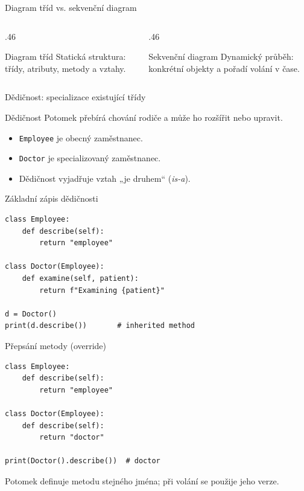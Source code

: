 \documentclass[aspectratio=169]{beamer}
\begin{document}
\begin{frame}{Diagram tříd vs. sekvenční diagram}
  \begin{columns}[T]
    \begin{column}{.46\textwidth}
      \begin{block}{Diagram tříd}
        Statická struktura: třídy, atributy, metody a vztahy.
      \end{block}
    \end{column}
    \begin{column}{.46\textwidth}
      \begin{block}{Sekvenční diagram}
        Dynamický průběh: konkrétní objekty a pořadí volání v čase.
      \end{block}
    \end{column}
  \end{columns}
\end{frame}

\begin{frame}{Dědičnost: specializace existující třídy}
  \begin{block}{Dědičnost}
    Potomek přebírá chování rodiče a může ho rozšířit nebo upravit.
  \end{block}
  \begin{itemize}
    \item \texttt{Employee} je obecný zaměstnanec.
    \item \texttt{Doctor} je specializovaný zaměstnanec.
    \item Dědičnost vyjadřuje vztah „je druhem“ (\emph{is-a}).
  \end{itemize}
\end{frame}

\begin{frame}[fragile]{Základní zápis dědičnosti}
\begin{lstlisting}[style=python]
class Employee:
    def describe(self):
        return "employee"

class Doctor(Employee):
    def examine(self, patient):
        return f"Examining {patient}"

d = Doctor()
print(d.describe())       # inherited method
\end{lstlisting}
\end{frame}

\begin{frame}[fragile]{Přepsání metody (override)}
\begin{lstlisting}[style=python]
class Employee:
    def describe(self):
        return "employee"

class Doctor(Employee):
    def describe(self):
        return "doctor"

print(Doctor().describe())  # doctor
\end{lstlisting}
  Potomek definuje metodu stejného jména; při volání se použije jeho verze.
\end{frame}
\end{document}

